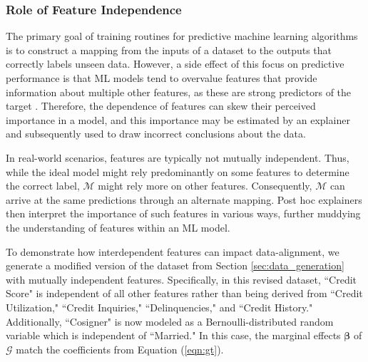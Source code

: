 \documentclass[mnsc,blindrev]{informs3}
\begin{document}
    
    \subsubsection{Role of Feature Independence}
        \label{sec:role_of_correlation}
        The primary goal of training routines for predictive machine learning algorithms is to construct a mapping from the inputs of a dataset to the outputs that correctly labels unseen data. However, a side effect of this focus on predictive performance is that ML models tend to overvalue features that provide information about multiple other features, as these are strong predictors of the target \citep{scholkopf2021toward}. Therefore, the dependence of features can skew their perceived importance in a model, and this importance may be estimated by an explainer and subsequently used to draw incorrect conclusions about the data.

        In real-world scenarios, features are typically not mutually independent. Thus, while the ideal model might rely predominantly on some features to determine the correct label, $\mathcal{M}$ might rely more on other features. Consequently, $\mathcal{M}$ can arrive at the same predictions through an alternate mapping.  Post hoc explainers then interpret the importance of such features in various ways, further muddying the understanding of features within an ML model.

         To demonstrate how interdependent features can impact data-alignment, we generate a modified version of the dataset from Section \ref{sec:data_generation} with mutually independent features. Specifically, in this revised dataset, ``Credit Score" is independent of all other features rather than being derived from ``Credit Utilization," ``Credit Inquiries," ``Delinquencies," and ``Credit History." Additionally, ``Cosigner"  is now modeled as a Bernoulli-distributed random variable which is independent of ``Married." In this case, the marginal effects $\boldsymbol{\beta}$ of $\mathcal{G}$ match the coefficients from Equation (\ref{eqn:gt}). %
        
\end{document}

